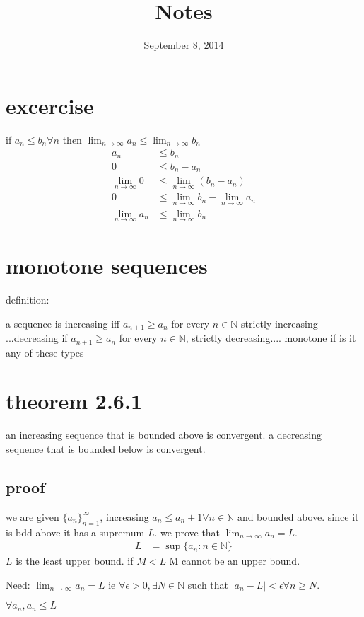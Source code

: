 \documentclass[letterpaper]{article}
\begin{document}
\title{Notes}
\date{September 8, 2014}
\maketitle
\section*{excercise}
if $a_n\le b_n\forall n$ then $\lim_{n\to\infty}a_n\le\lim_{n\to\infty}b_n$
\begin{align*}
  a_n&\le b_n\\
  0&\le b_n-a_n\\
  \lim_{n\to\infty}0&\le\lim_{n\to\infty}(b_n-a_n)\\
  0&\le \lim_{n\to\infty}b_n-\lim_{n\to\infty}a_n\\
  \lim_{n\to\infty}a_n&\le\lim_{n\to\infty}b_n
\end{align*}

\section*{monotone sequences}
definition:

a sequence is increasing iff $a_{n+1}\ge a_n$ for every $n\in\mathbb{N}$ strictly increasing ...decreasing if $a_{n+1}\ge a_n$ for every $n\in\mathbb{N}$, strictly decreasing.... monotone if is it any of these types

\section*{theorem 2.6.1}
an increasing sequence that is bounded above is convergent. a decreasing sequence that is bounded below is convergent.
\subsection*{proof}
we are given $\{a_n\}_{n=1}^\infty$, increasing $a_n\le a_n+1\forall n\in\mathbb{N}$ and bounded above. since it is bdd above it has a supremum $L$. we prove that $\lim_{n\to\infty}a_n=L$.
\begin{align*}
  L&=\sup\{a_n:n\in\mathbb{N}\}
\end{align*}
$L$ is the least upper bound. if $M<L$ M cannot be an upper bound.

Need: $\lim_{n\to\infty}a_n=L$ ie $\forall\epsilon>0,\exists N\in\mathbb{N}$ such that $|a_n-L|<\epsilon\forall n\ge N$.

$\forall a_n,a_n\le L$
\end{document}

